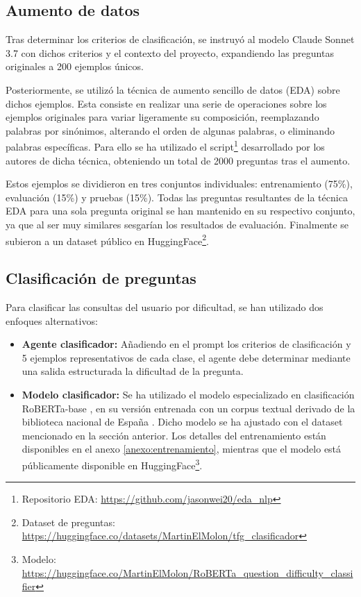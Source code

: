 \subsection{Aumento de datos}
Tras determinar los criterios de clasificación, se instruyó al modelo Claude Sonnet 3.7 con dichos criterios y el contexto del proyecto, expandiendo las preguntas originales a 200 ejemplos únicos.

Posteriormente, se utilizó la técnica de aumento sencillo de datos (EDA) \cite{wei_eda_2019} sobre dichos ejemplos. Esta consiste en realizar una serie de operaciones sobre los ejemplos originales para variar ligeramente su composición, reemplazando palabras por sinónimos, alterando el orden de algunas palabras, o eliminando palabras específicas. Para ello se ha utilizado el script\footnote{Repositorio EDA: \url{https://github.com/jasonwei20/eda_nlp}} desarrollado por los autores de dicha técnica, obteniendo un total de 2000 preguntas tras el aumento.

Estos ejemplos se dividieron en tres conjuntos individuales: entrenamiento (75\%), evaluación (15\%) y pruebas (15\%). Todas las preguntas resultantes de la técnica EDA para una sola pregunta original se han mantenido en su respectivo conjunto, ya que al ser muy similares sesgarían los resultados de evaluación. Finalmente se subieron a un dataset público en HuggingFace\footnote{Dataset de preguntas: \url{https://huggingface.co/datasets/MartinElMolon/tfg_clasificador}}.

\subsection{Clasificación de preguntas}
Para clasificar las consultas del usuario por dificultad, se han utilizado dos enfoques alternativos:

\begin{itemize}
\item\textbf{Agente clasificador: }Añadiendo en el prompt los criterios de clasificación y 5 ejemplos representativos de cada clase, el agente debe determinar mediante una salida estructurada la dificultad de la pregunta.
\item\textbf{Modelo clasificador: }Se ha utilizado el modelo especializado en clasificación RoBERTa-base \cite{liu_roberta_2019}, en su versión entrenada con un corpus textual derivado de la biblioteca nacional de España \cite{gutierrez-fandino_maria_2021}. Dicho modelo se ha ajustado con el dataset mencionado en la sección anterior. Los detalles del entrenamiento están disponibles en el anexo \ref{anexo:entrenamiento}, mientras que el modelo está públicamente disponible en HuggingFace\footnote{Modelo: \url{https://huggingface.co/MartinElMolon/RoBERTa_question_difficulty_classifier}}.

\end{itemize}
